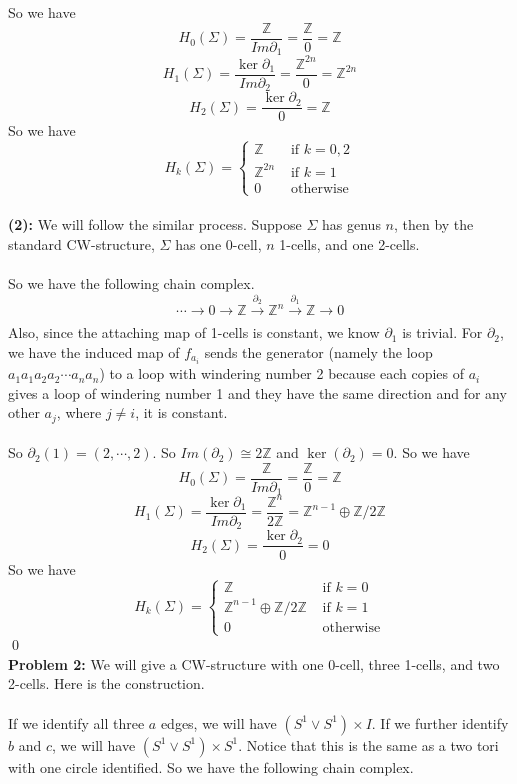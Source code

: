\documentclass[12pt]{amsart}
\newcommand{\Z}{\mathbb{Z}}
\begin{document}
So we have 
\[H_0(\Sigma)=\frac{\Z}{Im \partial_1}=\frac{\Z}{0}=\Z\]
\[H_1(\Sigma)=\frac{\ker \partial_1}{Im \partial_2}=\frac{\Z^{2n}}{0}=\Z^{2n}\]
\[H_2(\Sigma)=\frac{\ker \partial_2}{0}=\Z\]
So we have 
\[H_k(\Sigma)=\begin{cases}
    \Z & \text{ if }k=0,2\\
    \Z^{2n} &\text{ if }k=1\\
    0&\text{ otherwise}
\end{cases}\]\\
\textbf{(2): } We will follow the similar process. Suppose $\Sigma$ has genus $n$, then by the standard CW-structure, $\Sigma$ has one 0-cell, $n$ 1-cells, and one 2-cells.\\
\vspace{4cm}\\
So we have the following chain complex. 
\[\cdots\to0\to\Z\xrightarrow[]{\partial_2}\Z^{n}\xrightarrow[]{\partial_1}\Z\to 0 \]
Also, since the attaching map of 1-cells is constant, we know $\partial_1$ is trivial. For $\partial_2$, we have the induced map of $f_{a_i}$ sends the generator (namely the loop $a_1a_1a_2a_2\cdots a_na_n$) to a loop with windering number 2 because each copies of $a_i$ gives a loop of windering number 1 and they have the same direction and for any other $a_j$, where $j\neq i$, it is constant.\pagebreak\\
\vspace{6cm}\\
So $\partial_2(1)=(2,\cdots,2)$. So $Im(\partial_2)\cong 2\Z$ and $\ker(\partial_2)=0$. So we have 
\[H_0(\Sigma)=\frac{\Z}{Im \partial_1}=\frac{\Z}{0}=\Z\]
\[H_1(\Sigma)=\frac{\ker \partial_1}{Im \partial_2}=\frac{\Z^n}{2\Z}=\Z^{n-1}\oplus \Z/2\Z\]
\[H_2(\Sigma)=\frac{\ker \partial_2}{0}=0\]
So we have 
\[H_k(\Sigma)=\begin{cases}
    \Z & \text{ if }k=0\\
    \Z^{n-1}\oplus \Z/2\Z &\text{ if }k=1\\
    0&\text{ otherwise}
\end{cases}\]
\qed\\
\textbf{Problem 2:} We will give a CW-structure with one 0-cell, three 1-cells, and two 2-cells. Here is the construction.\\
\vspace{6cm}\\
If we identify all three $a$ edges, we will have $(S^1\vee S^1)\times I$. If we further identify $b$ and $c$, we will have $(S^1\vee S^1)\times S^1$. Notice that this is the same as a two tori with one circle identified. So we have the following chain complex.
\end{document}
